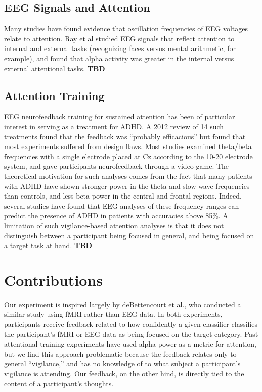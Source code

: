 \documentclass[11pt]{report}
\begin{document}
\subsection{EEG Signals and Attention}
Many studies have found evidence that oscillation frequencies of EEG voltages relate to attention.  Ray et al\cite{Ray} studied EEG signals that reflect attention to internal and external tasks (recognizing faces versus mental arithmetic, for example), and found that alpha activity was greater in the internal versus external attentional tasks.   {\bf TBD} 

\subsection{Attention Training}
	EEG neurofeedback training for sustained attention has been of particular interest in serving as a treatment for ADHD.  A 2012 review\cite{Lofthouse} of 14 such treatments found that the feedback was ``probably efficacious'' but found that most experiments suffered from design flaws.  Most studies examined theta/beta frequencies with a single electrode placed at Cz according to the 10-20 electrode system, and gave participants neurofeedback through a video game.  The theoretical motivation for such analyses comes from the fact that many patients with ADHD have shown stronger power in the theta and slow-wave frequencies than controls, and less beta power in the central and frontal regions.  Indeed, several studies\cite{Barry} have found that EEG analyses of these frequency ranges can predict the presence of ADHD in patients with accuracies above 85\%.  A limitation of such vigilance-based attention analyses is that it does not distinguish between a participant being focused in general, and being focused on a target task at hand. {\bf TBD}

\section{Contributions}
Our experiment is inspired largely by deBettencourt et al.\cite{deBettencourt}, who conducted a similar study using fMRI rather than EEG data.  In both experiments, participants receive feedback related to how confidently a given classifier classifies the participant’s fMRI or EEG data as being focused on the target category.  Past attentional training experiments have used alpha power as a metric for attention, but we find this approach problematic because the feedback relates only to general “vigilance,” and has no knowledge of to what subject a participant’s vigilance is attending.  Our feedback, on the other hind, is directly tied to the content of a participant’s thoughts.
\end{document}
